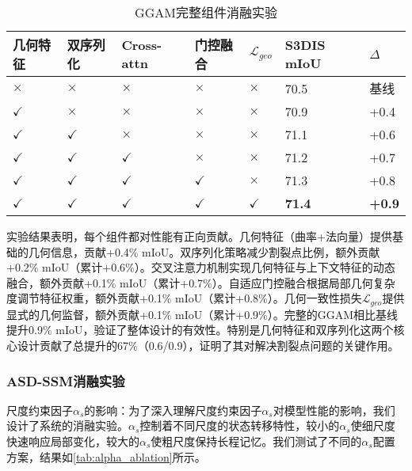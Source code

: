 \documentclass[preprint,12pt]{elsarticle}
\begin{document}
\begin{table}[htbp!]
	\centering
	\caption{GGAM完整组件消融实验}
	\label{tab:ggam_full_ablation}
	\begin{tabular}{@{}lllllll@{}}
		\toprule
		几何特征 & 双序列化 & Cross-attn & 门控融合 & $\mathcal{L}_{geo}$ & S3DIS mIoU & $\Delta$ \\ 
		\midrule
		$\times$ & $\times$ & $\times$ & $\times$ & $\times$ & 70.5 & 基线 \\
		\midrule
		$\checkmark$ & $\times$ & $\times$ & $\times$ & $\times$ & 70.9 & +0.4 \\
		$\checkmark$ & $\checkmark$ & $\times$ & $\times$ & $\times$ & 71.1 & +0.6 \\
		$\checkmark$ & $\checkmark$ & $\checkmark$ & $\times$ & $\times$ & 71.2 & +0.7 \\
		$\checkmark$ & $\checkmark$ & $\checkmark$ & $\checkmark$ & $\times$ & 71.3 & +0.8 \\
		\textbf{$\checkmark$} & \textbf{$\checkmark$} & \textbf{$\checkmark$} & \textbf{$\checkmark$} & \textbf{$\checkmark$} & \textbf{71.4} & \textbf{+0.9} \\
		\bottomrule
	\end{tabular}
\end{table}

实验结果表明，每个组件都对性能有正向贡献。几何特征（曲率+法向量）提供基础的几何信息，贡献+0.4\% mIoU。双序列化策略减少割裂点比例，额外贡献+0.2\% mIoU（累计+0.6\%）。交叉注意力机制实现几何特征与上下文特征的动态融合，额外贡献+0.1\% mIoU（累计+0.7\%）。自适应门控融合根据局部几何复杂度调节特征权重，额外贡献+0.1\% mIoU（累计+0.8\%）。几何一致性损失$\mathcal{L}_{geo}$提供显式的几何监督，额外贡献+0.1\% mIoU（累计+0.9\%）。完整的GGAM相比基线提升0.9\% mIoU，验证了整体设计的有效性。特别是几何特征和双序列化这两个核心设计贡献了总提升的67\%（0.6/0.9），证明了其对解决割裂点问题的关键作用。

\subsubsection{ASD-SSM消融实验}

尺度约束因子$\alpha_s$的影响：为了深入理解尺度约束因子$\alpha_s$对模型性能的影响，我们设计了系统的消融实验。$\alpha_s$控制着不同尺度的状态转移特性，较小的$\alpha_s$使细尺度快速响应局部变化，较大的$\alpha_s$使粗尺度保持长程记忆。我们测试了不同的$\alpha_s$配置方案，结果如\cref{tab:alpha_ablation}所示。
\end{document}
